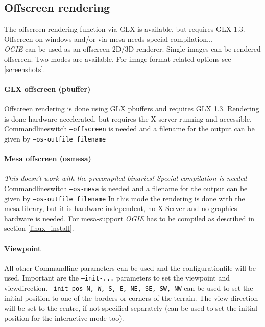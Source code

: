 \subsection{Offscreen rendering}

The offscreen rendering function via GLX is available, but requires GLX 1.3. Offscreen on windows and/or via mesa needs
special compilation... \\

\emph{OGIE} can be used as an offscreen 2D/3D renderer. 
Single images can be rendered offscreen. Two modes are available. For image format related options see \ref{screenshots}.

\paragraph{GLX offscreen (pbuffer)}
Offscreen rendering is done using GLX pbuffers and requires GLX 1.3. Rendering is done hardware accelerated, but requires the X-server running and accessible.
Commandlineswitch \texttt{--offscreen} is needed and
a filename for the output can be given by \texttt{--os-outfile filename}

\paragraph{Mesa offscreen (osmesa)}
\emph{This doesn't work with the precompiled binaries! Special compilation is needed}
Commandlineswitch \texttt{--os-mesa} is needed and
a filename for the output can be given by \texttt{--os-outfile filename}
In this mode the rendering is done with the mesa library, but it is hardware independent, no X-Server and no graphics hardware is needed.
For mesa-support \emph{OGIE} has to be compiled as described in section \ref{linux_install}.

\paragraph{Viewpoint}
All other Commandline parameters can be used and the configurationfile will be used.
Important are the \texttt{--init-...} parameters to set the viewpoint and viewdirection.
\texttt{--init-pos-N, W, S, E, NE, SE, SW, NW}  can be used to set the initial position to one
of the borders or corners of the terrain. The view direction will be set to the
centre, if not specified separately (can be used to set the initial position for
the interactive mode too).





